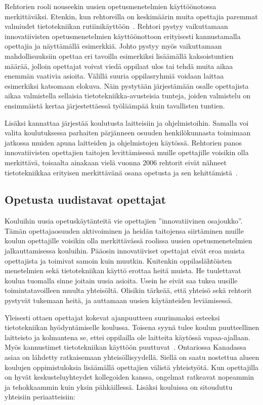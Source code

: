 \documentclass[utf8,bachelor]{gradu3}
\begin{document}
Rehtorien rooli nouseekin uusien opetusmenetelmien käyttöönotossa merkittäväksi. Etenkin, kun rehtoreilla on keskimäärin muita opettajia paremmat valmiudet tietotekniikan rutiinikäyttöön~\parencite[][]{itviikkoWilen}. Rehtori pystyy vaikuttamaan innovatiivisten opetusmenetelmien käyttöönottoon erityisesti kannustamalla opettajia ja näyttämällä esimerkkiä. Johto pystyy myös vaikuttamaan mahdollisuuksiin opettaa eri tavoilla esimerkiksi lisäämällä kaksoistuntien määrää, jolloin opettajat voivat viedä oppilaat ulos tai tehdä muita aikaa enemmän vaativia asioita. Välillä suuria oppilasryhmiä voidaan laittaa esimerkiksi katsomaan elokuva. Näin pystytään järjestämään osalle opettajista aikaa valmistella sellaisia tietotekniikka-avusteisia tunteja, joiden valmistelu on ensimmäistä kertaa järjestettäessä työläämpää kuin tavallisten tuntien.

Lisäksi kannattaa järjestää koulutusta laitteisiin ja ohjelmistoihin. Samalla voi valita koulutuksessa parhaiten pärjänneen osuuden henkilökunnasta toimimaan jatkossa muiden apuna laitteiden ja ohjelmistojen käytössä. Rehtorien panos innovatiivisten opettajien taitojen levittämisessä muille opettajille voisikin olla merkittävä, toisaalta ainakaan vielä vuonna 2006 rehtorit eivät nähneet tietotekniikkaa erityisen merkittävänä osana opetusta ja sen kehittämistä~\parencite[][]{koulunArki}.

\subsection{Opetusta uudistavat opettajat}
Kouluihin uusia opetuskäytänteitä vie opettajien ''innovatiivinen osajoukko''. Tämän opettajaosuuden aktivoiminen ja heidän taitojensa siirtäminen muille koulun opettajille voisikin olla merkittävässä roolissa uusien opetusmenetelmien jalkauttamisessa kouluihin. Pääosin innovatiiviset opettajat eivät eroa muista opettajista ja toimivat samoin kuin muutkin. Kuitenkin oppilaslähtöisten menetelmien sekä tietotekniikan käyttö erottaa heitä muista. He tuulettavat koulua tuomalla sinne joitain uusia asioita. Usein he eivät saa tukea uusille toimintatavoilleen muulta yhteisöltä. Olisikin tärkeää, että yhteisö sekä rehtorit pystyvät tukemaan heitä, ja auttamaan uusien käytänteiden leviämisessä. ~\parencite[][]{koulunArki}

Yleisesti ottaen opettajat kokevat ajanpuutteen suurimmaksi esteeksi tietotekniikan hyödyntämiselle koulussa. Toisena syynä tulee koulun puutteellinen laitteisto ja kolmantena se, ettei oppilailla ole laitteita käytössä vapaa-ajallaan. ~\parencite[][]{sites} Myös kannustimet tietotekniikan käyttöön puuttuvat~\parencite[][]{itviikkoWilen}. Ontariossa Kanadassa asiaa on lähdetty ratkaisemaan yhteisöllisyydellä.
Siellä on saatu nostettua alueen koulujen oppimistuloksia lisäämällä opettajien välistä yhteistyötä. Kun opettajilla on hyvät keskusteluyhteydet kollegoiden kanssa, ongelmat ratkeavat nopeammin ja tehokkaammin kuin yksin pähkäillessä. Lisäksi kouluissa on sitouduttu yhteisiin periaatteisiin:
\end{document}
